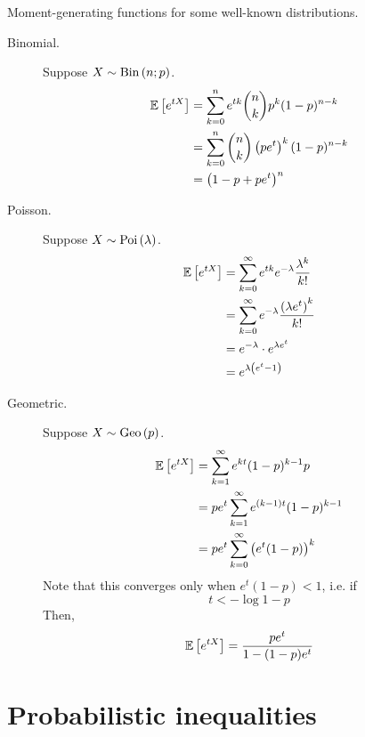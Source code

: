 \documentclass[11pt]{article}
\begin{document}
Moment-generating functions for some well-known distributions.
%
\begin{description}
    \item[Binomial.]
        Suppose $X \sim \operatorname{Bin}\left(n;p\right)$.
        \begin{align*}
            \operatorname{\mathbb{E}}{\left[e^{tX}\right]}
            &= \sum_{k=0}^n e^{tk} \binom{n}{k} p^k (1-p)^{n-k} \\
            &= \sum_{k=0}^n \binom{n}{k} \left(pe^t\right)^k (1-p)^{n-k} \\
            &= \left(1 - p + pe^t\right)^n
        \end{align*}
    \item[Poisson.]
        Suppose $X \sim \operatorname{Poi}\left(\lambda\right)$.
        \begin{align*}
            \operatorname{\mathbb{E}}{\left[e^{tX}\right]}
            &= \sum^\infty_{k=0} e^{tk} e^{-\lambda} \frac{\lambda^k}{k!} \\
            &= \sum^\infty_{k=0} e^{-\lambda} \frac{\left(\lambda e^t\right)^k}{k!} \\
            &= e^{-\lambda} \cdot e^{\lambda e^t} \\
            &= e^{\lambda \left(e^t - 1\right)}
        \end{align*}
    \item[Geometric.]
        Suppose $X \sim \operatorname{Geo}\left(p\right)$.
        \begin{align*}
            \operatorname{\mathbb{E}}{\left[e^{tX}\right]}
            &= \sum^\infty_{k=1} e^{kt} (1-p)^{k-1} p \\
            &= p e^t \sum^\infty_{k=1} e^{(k - 1)t} (1-p)^{k-1} \\
            &= p e^t \sum^\infty_{k=0} \left(e^t (1-p)\right)^k
        \end{align*}
        Note that this converges only when $e^t (1-p) < 1$, i.e. if
        \begin{equation*}
            t < - \log {1-p}
        \end{equation*}
        Then,
        \begin{equation*}
            \operatorname{\mathbb{E}}{\left[e^{tX}\right]}
            =
            \frac{p e^t}{1 - (1-p)e^t}
        \end{equation*}
\end{description}

\section{Probabilistic inequalities}
\end{document}
